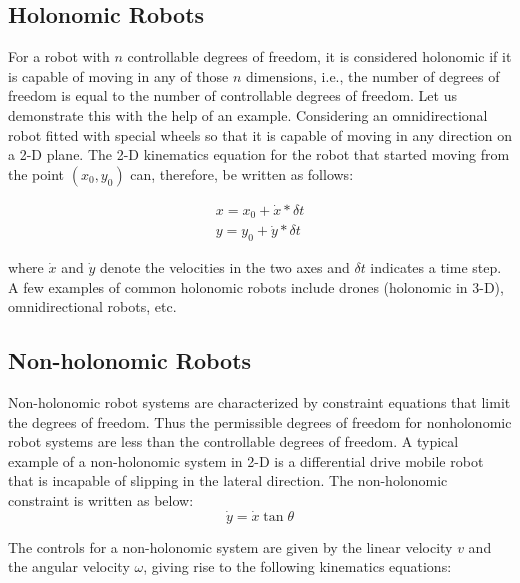 \subsection{Holonomic Robots}\label{sec:holonomic_robots}

For a robot with $n$ controllable degrees of freedom, it is considered holonomic if it is capable of moving in any of those $n$ dimensions, i.e., the number of degrees of freedom is equal to the number of controllable degrees of freedom. Let us demonstrate this with the help of an example. Considering an omnidirectional robot fitted with special wheels so that it is capable of moving in any direction on a 2-D plane. The 2-D kinematics equation for the robot that started moving from the point $(x_0, y_0)$ can, therefore, be written as follows:

\begin{subequations}
\begin{align}
x = x_0+\dot{x}*\delta t\\
y = y_0+\dot{y}*\delta t
\end{align}
\label{eqn: holonomic_kinematics}
\end{subequations}

where $\dot{x}$ and $\dot{y}$ denote the velocities in the two axes and $\delta t$ indicates a time step.
A few examples of common holonomic robots include drones (holonomic in 3-D), omnidirectional robots, etc.

\subsection{Non-holonomic Robots}\label{sec:nonhn_robots}

Non-holonomic robot systems are characterized by constraint equations that limit the degrees of freedom. Thus the permissible degrees of freedom for nonholonomic robot systems are less than the controllable degrees of freedom. A typical example of a non-holonomic system in 2-D is a differential drive mobile robot that is incapable of slipping in the lateral direction. The non-holonomic constraint is written as below:
\begin{equation}
\dot{y} = \dot{x}\tan{\theta}
\label{eqn: non_holonomic_kinematics}
\end{equation}

The controls for a non-holonomic system are given by the linear velocity $v$ and the angular velocity $\omega$, giving rise to the following kinematics equations:

